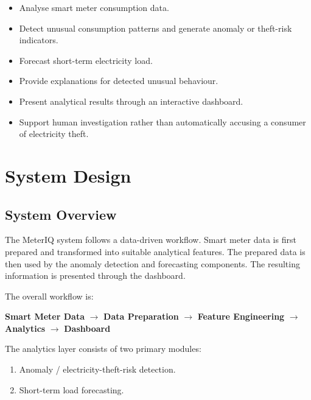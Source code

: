\documentclass[12pt,a4paper]{report}
\begin{document}
\begin{itemize}
    \item Analyse smart meter consumption data.
    \item Detect unusual consumption patterns and generate anomaly or
          theft-risk indicators.
    \item Forecast short-term electricity load.
    \item Provide explanations for detected unusual behaviour.
    \item Present analytical results through an interactive dashboard.
    \item Support human investigation rather than automatically accusing a
          consumer of electricity theft.
\end{itemize}



\chapter{System Design}


\section{System Overview}

The MeterIQ system follows a data-driven workflow. Smart meter data is first
prepared and transformed into suitable analytical features. The prepared
data is then used by the anomaly detection and forecasting components. The
resulting information is presented through the dashboard.

The overall workflow is:

\begin{center}
\textbf{Smart Meter Data}
$\rightarrow$
\textbf{Data Preparation}
$\rightarrow$
\textbf{Feature Engineering}
$\rightarrow$
\textbf{Analytics}
$\rightarrow$
\textbf{Dashboard}
\end{center}

The analytics layer consists of two primary modules:

\begin{enumerate}
    \item Anomaly / electricity-theft-risk detection.
    \item Short-term load forecasting.
\end{enumerate}
\end{document}
